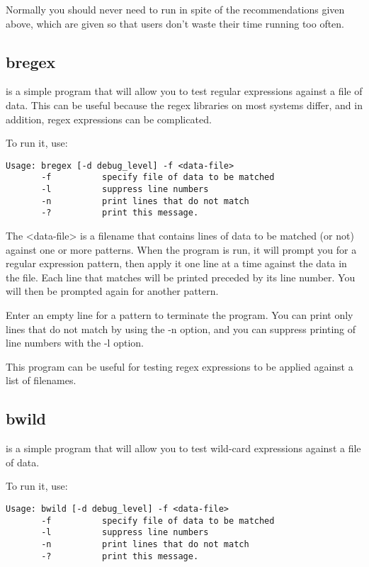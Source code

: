 Normally
you should never need to run  in spite of the
recommendations given above, which are given so that users don't
waste their time running  too often.

\subsection{bregex}
\label{bregex}

 is a simple program that will allow you to test
regular expressions against a file of data. This can be useful
because the regex libraries on most systems differ, and in
addition, regex expressions can be complicated.

To run it, use:

\begin{verbatim}
Usage: bregex [-d debug_level] -f <data-file>
       -f          specify file of data to be matched
       -l          suppress line numbers
       -n          print lines that do not match
       -?          print this message.
\end{verbatim}

The {\textless}data-file{\textgreater} is a filename that contains lines
of data to be matched (or not) against one or more patterns.
When the program is run, it will prompt you for a regular
expression pattern, then apply it one line at a time against
the data in the file. Each line that matches will be printed
preceded by its line number.  You will then be prompted again
for another pattern.

Enter an empty line for a pattern to terminate the program. You
can print only lines that do not match by using the -n option,
and you can suppress printing of line numbers with the -l option.

This program can be useful for testing regex expressions to be
applied against a list of filenames.

\subsection{bwild}
\label{bwild}

 is a simple program that will allow you to test
wild-card expressions against a file of data.

To run it, use:

\begin{verbatim}
Usage: bwild [-d debug_level] -f <data-file>
       -f          specify file of data to be matched
       -l          suppress line numbers
       -n          print lines that do not match
       -?          print this message.
\end{verbatim}

